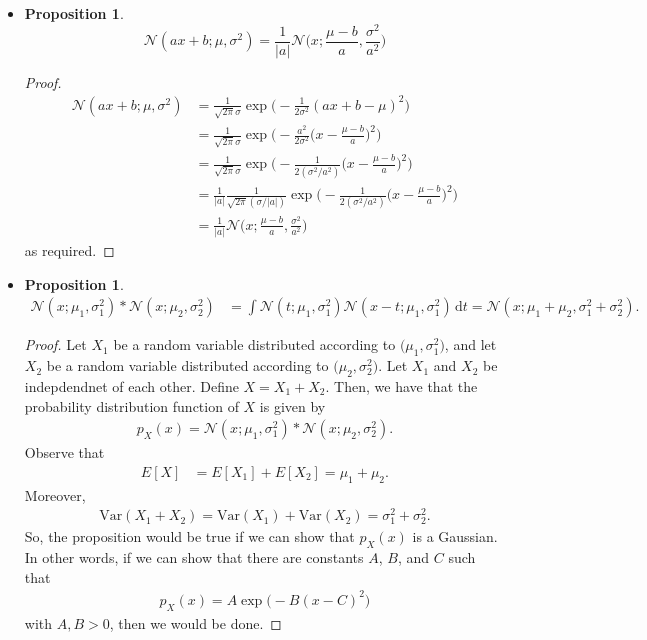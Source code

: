 \documentclass[10pt]{article}
\newtheorem{proposition}[lemma]{Proposition}
\newcommand{\dee}{\mathrm{d}}
\newcommand{\Var}{\mathrm{Var}}
\newcommand{\mcal}[1]{\mathcal{#1}}
\begin{document}
\begin{itemize}
  \item \begin{proposition} \label{gaussian-scaling}
    $$\mcal{N}(ax + b; \mu, \sigma^2) = \frac{1}{|a|} \mcal{N}\bigg( x ; \frac{\mu - b}{a}, \frac{\sigma^2}{a^2} \bigg)$$
  \end{proposition}
  \begin{proof}
    \begin{align*}
    \mcal{N}(ax + b; \mu, \sigma^2)
    &= \frac{1}{\sqrt{2\pi}\sigma} \exp\bigg(-\frac{1}{2\sigma^2} (ax+b-\mu)^2 \bigg) \\
    &= \frac{1}{\sqrt{2\pi}\sigma} \exp\bigg(-\frac{a^2}{2\sigma^2} \bigg(x-\frac{\mu-b}{a} \bigg)^2 \bigg) \\
    &= \frac{1}{\sqrt{2\pi}\sigma} \exp\bigg(-\frac{1}{2(\sigma^2/a^2)} \bigg(x-\frac{\mu-b}{a} \bigg)^2 \bigg) \\
    &= \frac{1}{|a|} \frac{1}{\sqrt{2\pi}(\sigma / |a|)} \exp\bigg(-\frac{1}{2(\sigma^2/a^2)} \bigg(x-\frac{\mu-b}{a} \bigg)^2 \bigg) \\
    &= \frac{1}{|a|}\mcal{N}\bigg( x ; \frac{\mu - b}{a}, \frac{\sigma^2}{a^2} \bigg)
    \end{align*}
    as required.
  \end{proof}

  \item \begin{proposition} \label{gaussian-convolution}
    \begin{align*}
    \mcal{N}(x;\mu_1, \sigma_1^2) * \mcal{N}(x;\mu_2, \sigma_2^2)
    &= \int \mcal{N}(t;\mu_1, \sigma_1^2) \mcal{N}(x-t;\mu_1, \sigma_1^2)\, \dee t
    = \mcal{N}(x; \mu_1 + \mu_2, \sigma_1^2 + \sigma_2^2).
    \end{align*}
  \end{proposition}
  \begin{proof}
    Let $X_1$ be a random variable distributed according to $\mcal(\mu_1, \sigma_1^2)$, and let $X_2$ be a random variable distributed according to $\mcal(\mu_2, \sigma_2^2)$. Let $X_1$ and $X_2$ be indepdendnet of each other. Define $X = X_1 + X_2$. Then,
    we have that the probability distribution function of $X$ is given by
    \begin{align*}
      p_X(x) = \mcal{N}(x;\mu_1, \sigma_1^2) * \mcal{N}(x;\mu_2, \sigma_2^2).
    \end{align*}
    Observe that 
    \begin{align*}
      E[X] &= E[X_1] + E[X_2] = \mu_1 + \mu_2.
    \end{align*}
    Moreover,
    \begin{align*}
      \Var(X_1 + X_2) = \Var(X_1) + \Var(X_2) = \sigma_1^2 + \sigma_2^2.
    \end{align*}
    So, the proposition would be true if we can show that $p_X(x)$ is a Gaussian. In other words, if we can show that there are constants $A$, $B$, and $C$ such that
    \begin{align*}
      p_X(x) = A \exp\big(-B(x - C)^2\big)
    \end{align*}    
    with $A, B > 0$, then we would be done.


\end{proof}
\end{itemize}
\end{document}
